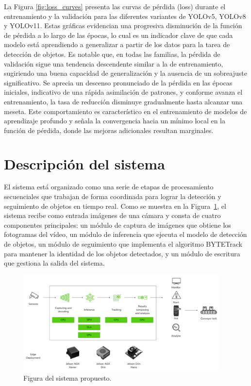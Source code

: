 \documentclass[11pt,spanish,listoffigures,listoftables]{tfgetsinf}
\begin{document}
La Figura \ref{fig:loss_curves} presenta las curvas de pérdida (loss) durante el entrenamiento y la validación para las diferentes variantes de YOLOv5, YOLOv8 y YOLOv11. Estas gráficas evidencian una progresiva disminución de la función de pérdida a lo largo de las épocas, lo cual es un indicador clave de que cada modelo está aprendiendo a generalizar a partir de los datos para la tarea de detección de objetos. Es notable que, en todas las familias, la pérdida de validación sigue una tendencia descendente similar a la de entrenamiento, sugiriendo una buena capacidad de generalización y la ausencia de un sobreajuste significativo. Se aprecia un descenso pronunciado de la pérdida en las épocas iniciales, indicativo de una rápida asimilación de patrones, y conforme avanza el entrenamiento, la tasa de reducción disminuye gradualmente hasta alcanzar una meseta. Este comportamiento es característico en el entrenamiento de modelos de aprendizaje profundo y señala la convergencia hacia un mínimo local en la función de pérdida, donde las mejoras adicionales resultan marginales.



\section{Descripción del sistema} \label{sec:descripcion_sistema}

El sistema está organizado como una serie de etapas de procesamiento secuenciales que trabajan de forma coordinada para lograr la detección y seguimiento de objetos en tiempo real. Como se muestra en la Figura~\ref{fig:sistema_propuesto}, el sistema recibe como entrada imágenes de una cámara y consta de cuatro componentes principales: un módulo de captura de imágenes que obtiene los fotogramas del vídeo, un módulo de inferencia que ejecuta el modelo de detección de objetos, un módulo de seguimiento que implementa el algoritmo BYTETrack para mantener la identidad de los objetos detectados, y un módulo de escritura que gestiona la salida del sistema.
\begin{figure}[H]
   \centering
   \includegraphics[width=0.95\textwidth]{images/diseno_e_implementacion/figura_TFG_v3.png}
   \caption{Figura del sistema propuesto.}
   \label{fig:sistema_propuesto}
\end{figure}
\end{document}
